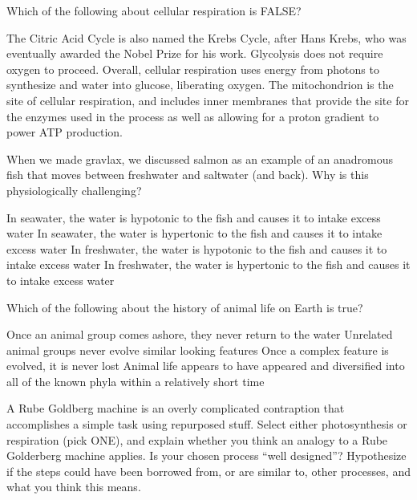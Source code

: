 \documentclass[exam,addpoints,noanswers]{exam}
\begin{document}
\begin{questions}
\question[1] Which of the following about cellular respiration is FALSE? 
\begin{choices}
\choice The Citric Acid Cycle is also named the Krebs Cycle, after Hans Krebs, who was eventually awarded the Nobel Prize for his work. 
\choice Glycolysis does not require oxygen to proceed. 
\CorrectChoice Overall, cellular respiration uses energy from photons to synthesize  and water into glucose, liberating oxygen. 
\choice The mitochondrion is the site of cellular respiration, and includes inner membranes that provide the site for the enzymes used in the process as well as allowing for a proton gradient to power ATP production. 
\end{choices}




\question[1] When we made gravlax, we discussed salmon as an example of an anadromous fish that moves between freshwater and saltwater (and back). Why is this physiologically challenging? 
\begin{choices}
\choice In seawater, the water is hypotonic to the fish and causes it to intake excess water
\choice In seawater, the water is hypertonic to the fish and causes it to intake excess water
\CorrectChoice In freshwater, the water is hypotonic to the fish and causes it to intake excess water
\choice In freshwater, the water is hypertonic to the fish and causes it to intake excess water
\end{choices}




\question[1] Which of the following about the history of animal life on Earth is true? 
\begin{choices}
\choice Once an animal group comes ashore, they never return to the water
\choice Unrelated animal groups never evolve similar looking features
\choice Once a complex feature is evolved, it is never lost
\CorrectChoice Animal life appears to have appeared and diversified into all of the known phyla within a relatively short time
\end{choices}



\clearpage
\question[22] A Rube Goldberg machine is an overly complicated contraption that accomplishes a simple task using repurposed stuff. Select either photosynthesis or respiration (pick ONE), and explain whether you think an analogy to a Rube Golderberg machine applies. Is your chosen process ``well designed''? Hypothesize if the steps could have been borrowed from, or are similar to, other processes, and what you think this means. 


\end{questions}
\end{document}

